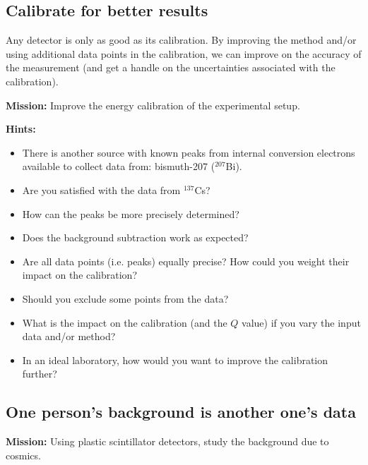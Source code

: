 \documentclass[a4,11pt, notitlepage]{article}
\begin{document}
\subsection{Calibrate for better results}
\label{sec:calibrate}

Any detector is only as good as its calibration. By improving the
method and/or using additional data points in the calibration, we can
improve on the accuracy of the measurement (and get a handle on the
uncertainties associated with the calibration).

\textbf{Mission:} Improve the energy calibration of the experimental setup.

\textbf{Hints:}
\begin{itemize}
\item There is another source with known peaks from internal
  conversion electrons available to collect data from: bismuth-207
  ($^{207}$Bi).
\item Are you satisfied with the data from $^{137}$Cs?
\item How can the peaks be more precisely determined?
\item Does the background subtraction work as expected?
\item Are all data points (i.e. peaks) equally precise? How could you
  weight their impact on the calibration?
\item Should you exclude some points from the data?
\item What is the impact on the calibration (and the $Q$ value) if you
  vary the input data and/or method?
\item In an ideal laboratory, how would you want to improve the
  calibration further?
\end{itemize}

\subsection{One person's background is another one's data}
\label{sec:background}

\textbf{Mission:} Using plastic scintillator detectors, study the
background due to cosmics.
\end{document}
